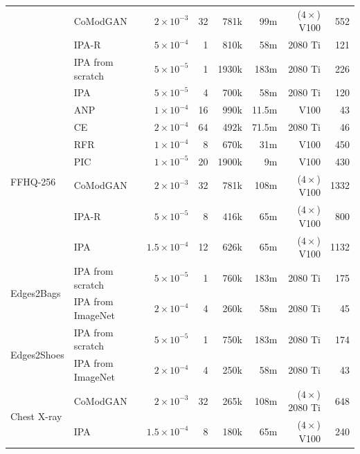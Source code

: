 \begin{table}[t]
\begin{tabular}{p{1.2cm}p{2cm}rrrrrr}
                                    & CoModGAN    & $2 \times 10^{-3}$    & 32    & 781k       & 99m   & {\scriptsize ($4 \times$)} V100 & 552 \\
                                    & IPA-R       & $5 \times 10^{-4}$    & 1     & 810k      & 58m   & 2080 Ti                         & 121 \\
                                    & IPA from scratch & $5 \times 10^{-5}$ & 1   & 1930k     & 183m  & 2080 Ti                         & 226 \\
                                    & IPA         & $5 \times 10^{-5}$    & 4     & 700k      & 58m   & 2080 Ti                         & 120 \\
      \midrule
      \multirow{7}{*}{FFHQ-256}     & ANP         & $1 \times 10^{-4}$    & 16    & 990k      & 11.5m & V100                            & 43 \\
                                    & CE          & $2 \times 10^{-4}$    & 64    & 492k      & 71.5m & 2080 Ti                         & 46 \\
                                    & RFR         & $1 \times 10^{-4}$    & 8     & 670k      & 31m   & V100                            & 450 \\
                                    & PIC         & $1 \times 10^{-5}$    & 20    & 1900k      & 9m    & V100                            & 430 \\
                                    & CoModGAN    & $2 \times 10^{-3}$    & 32    & 781k       & 108m  & {\scriptsize ($4 \times$)} V100 & 1332 \\
                                    & IPA-R       & $5 \times 10^{-5}$    & 8     & 416k      & 65m   & {\scriptsize ($4 \times$)} V100 & 800 \\
                                    & IPA         & $1.5 \times 10^{-4}$  & 12    & 626k      & 65m   & {\scriptsize ($4 \times$)} V100 & 1132 \\
      \midrule
      \multirow{2}{*}{Edges2Bags}   & IPA from scratch  & $5\times10^{-5}$ & 1   & 760k   & 183m  & 2080 Ti & 175 \\
                                    & IPA from ImageNet & $2\times10^{-4}$   & 4 & 260k   & 58m  & 2080 Ti  & 45 \\
      \midrule
      \multirow{2}{*}{Edges2Shoes}  & IPA from scratch  & $5\times10^{-5}$ & 1   & 750k   & 183m  & 2080 Ti & 174 \\
                                    & IPA from ImageNet & $2\times10^{-4}$ & 4   & 250k   & 58m  & 2080 Ti  & 43 \\
      \midrule
      \multirow{2}{*}{Chest X-ray}  & CoModGAN          & $2\times10^{-3}$ & 32 & 265k & 108m  & {\scriptsize ($4 \times$)} 2080 Ti & 648 \\  %
                                    & IPA               & $1.5\times10^{-4}$ & 8  & 180k & 65m & {\scriptsize ($4 \times$)} V100 & 240 \\  %
      \hline
  \end{tabular}
  \end{table}


